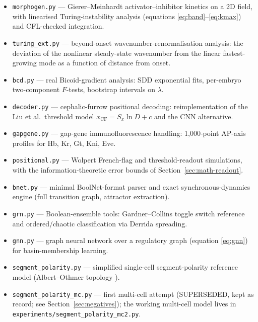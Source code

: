 \begin{itemize}
\item \texttt{morphogen.py} --- Gierer--Meinhardt activator--inhibitor
kinetics on a 2D field, with linearised Turing-instability analysis
(equations \eqref{eq:band}--\eqref{eq:kmax}) and CFL-checked integration.
\item \texttt{turing\_ext.py} --- beyond-onset wavenumber-renormalisation
analysis: the deviation of the nonlinear steady-state wavenumber from the
linear fastest-growing mode as a function of distance from onset.
\item \texttt{bcd.py} --- real Bicoid-gradient analysis: SDD exponential
fits, per-embryo two-component $F$-tests, bootstrap intervals on $\lambda$.
\item \texttt{decoder.py} --- cephalic-furrow positional decoding:
reimplementation of the Liu et al.\ threshold model
$x_{\mathrm{CF}} = S_x \ln D + c$ and the CNN alternative.
\item \texttt{gapgene.py} --- gap-gene immunofluorescence handling:
1{,}000-point AP-axis profiles for Hb, Kr, Gt, Kni, Eve.
\item \texttt{positional.py} --- Wolpert French-flag and threshold-readout
simulations, with the information-theoretic error bounds of
Section~\ref{sec:math-readout}.
\item \texttt{bnet.py} --- minimal BoolNet-format parser and exact
synchronous-dynamics engine (full transition graph, attractor extraction).
\item \texttt{grn.py} --- Boolean-ensemble tools: Gardner--Collins toggle
switch reference and ordered/chaotic classification via Derrida spreading.
\item \texttt{gnn.py} --- graph neural network over a regulatory graph
(equation \eqref{eq:gnn}) for basin-membership learning.
\item \texttt{segment\_polarity.py} --- simplified single-cell
segment-polarity reference model (Albert--Othmer topology
\cite{albert2003}).
\item \texttt{segment\_polarity\_mc.py} --- first multi-cell attempt
(SUPERSEDED, kept as record; see Section~\ref{sec:negatives}); the working
multi-cell model lives in \texttt{experiments/segment\_polarity\_mc2.py}.
\end{itemize}
